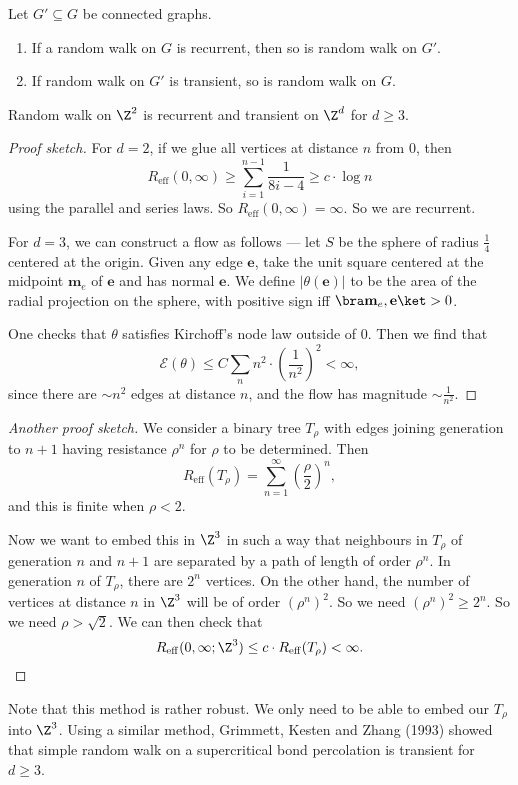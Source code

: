 \documentclass[a4paper]{article}
\begin{document}
\begin{cor}
  Let $G' \subseteq G$ be connected graphs.
  \begin{enumerate}
    \item If a random walk on $G$ is recurrent, then so is random walk on $G'$.
    \item If random walk on $G'$ is transient, so is random walk on $G$.
  \end{enumerate}
\end{cor}

\begin{thm}
  Random walk on $\Z^2$ is recurrent and transient on $\Z^d$ for $d \geq 3$.
\end{thm}

\begin{proof}[Proof sketch]
  For $d = 2$, if we glue all vertices at distance $n$ from $0$, then
  \[
    R_{\mathrm{eff}}(0, \infty) \geq \sum_{i = 1}^{n - 1} \frac{1}{8i - 4} \geq c \cdot \log n
  \]
  using the parallel and series laws. So $R_{\mathrm{eff}}(0, \infty) = \infty$. So we are recurrent.

  For $d = 3$, we can construct a flow as follows --- let $S$ be the sphere of radius $\frac{1}{4}$ centered at the origin. Given any edge $\mathbf{e}$, take the unit square centered at the midpoint $\mathbf{m}_e$ of $\mathbf{e}$ and has normal $\mathbf{e}$. We define $|\theta(\mathbf{e})|$ to be the area of the radial projection on the sphere, with positive sign iff $\bra \mathbf{m}_e, \mathbf{e} \ket > 0$.

  One checks that $\theta$ satisfies Kirchoff's node law outside of $0$. Then we find that
  \[
    \mathcal{E}(\theta) \leq C \sum_n n^2 \cdot \left(\frac{1}{n^2}\right)^2 < \infty,
  \]
  since there are $\sim n^2$ edges at distance $n$, and the flow has magnitude $\sim \frac{1}{n^2}$.
\end{proof}

\begin{proof}[Another proof sketch]
  We consider a binary tree $T_\rho$ with edges joining generation to $n + 1$ having resistance $\rho^n$ for $\rho$ to be determined. Then
  \[
    R_{\mathrm{eff}}(T_\rho) = \sum_{n = 1}^\infty \left(\frac{\rho}{2}\right)^n,
  \]
  and this is finite when $\rho < 2$.

  Now we want to embed this in $\Z^3$ in such a way that neighbours in $T_\rho$ of generation $n$ and $n + 1$ are separated by a path of length of order $\rho^n$. In generation $n$ of $T_\rho$, there are $2^n$ vertices. On the other hand, the number of vertices at distance $n$ in $\Z^3$ will be of order $(\rho^n)^2$. So we need $(\rho^n)^2 \geq 2^n$. So we need $\rho > \sqrt{2}$. We can then check that
  \[
    R_{\mathrm{eff}}(0, \infty; \Z^3) \leq c \cdot R_{\mathrm{eff}}(T_\rho) < \infty.\qedhere
  \]
\end{proof}
Note that this method is rather robust. We only need to be able to embed our $T_\rho$ into $\Z^3$. Using a similar method, Grimmett, Kesten and Zhang (1993) showed that simple random walk on a supercritical bond percolation is transient for $d \geq 3$.
\end{document}

